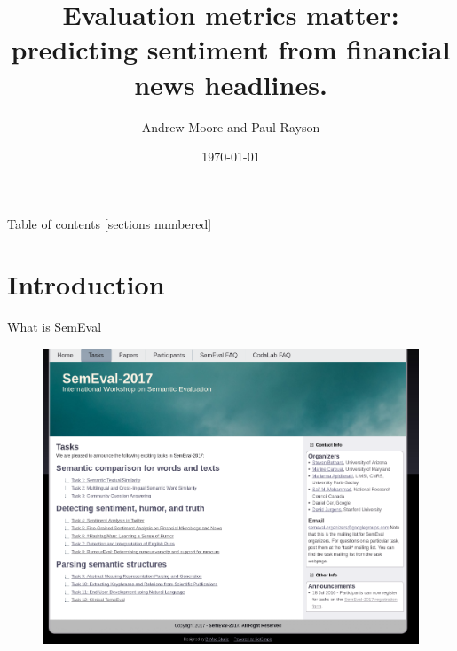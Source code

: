 \documentclass[10pt]{beamer}
\title{Evaluation metrics matter: predicting sentiment from financial news headlines.}
\author{Andrew Moore and Paul Rayson}
\date{\today}
\institute{School of Computing and Communications, Lancaster University.}
\begin{document}
\maketitle

\begin{frame}{Table of contents}
  [sections numbered]
  \tableofcontents[hideallsubsections]
\end{frame}

\section{Introduction}

\begin{frame}[fragile]{What is SemEval}
  \begin{figure}
    \includegraphics[scale=0.3]{SemEval.png}
  \end{figure}
\end{frame}

\end{document}
